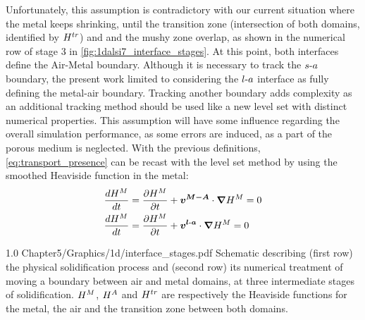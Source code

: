 Unfortunately, this assumption is contradictory with our current situation where the metal keeps shrinking, 
until the transition zone (intersection of both domains, identified by $H^{tr}$) and and the mushy zone overlap, as shown in the numerical row of stage 3 in \cref{fig:1dalsi7_interface_stages}.
At this point, both interfaces define the Air-Metal boundary. Although it is necessary to track the $s\text{-}a$ boundary, the present work limited to considering the $l\text{-}a$ interface as
fully defining the metal-air boundary. 
Tracking another boundary adds complexity as an additional tracking method should be used like a new level set with distinct numerical properties. This assumption will have some influence regarding the overall simulation performance, as some errors are induced, as a part of the porous medium is neglected.
With the previous definitions, \cref{eq:transport_presence} can be recast with the level set 
method by using the smoothed Heaviside function in the metal:
\begin{subequations}
\begin{align}
\label{eq:transport_heaviside}
& \frac{d H^M}{dt} = \frac{\partial H^M}{\partial t}  + \boldsymbol{v^{M-A}} \cdot \boldsymbol{\nabla} H^M = 0 \\
& \frac{d H^M}{dt} = \frac{\partial H^M}{\partial t}  + \boldsymbol{v^{l\text{-}a}} \cdot \boldsymbol{\nabla} H^M = 0
\end{align}
\end{subequations}

\begin{figureth}
{1.0}
{Chapter5/Graphics/1d/interface_stages.pdf}
{Schematic describing (first row) the physical solidification process and (second row) its numerical treatment of moving a boundary between air and metal domains, at three intermediate stages of 
solidification. $H^M$, $H^A$ and $H^{tr}$ are respectively the Heaviside functions for the metal, the air and the transition zone between both domains.}
\label{fig:1dalsi7_interface_stages}
\end{figureth}


